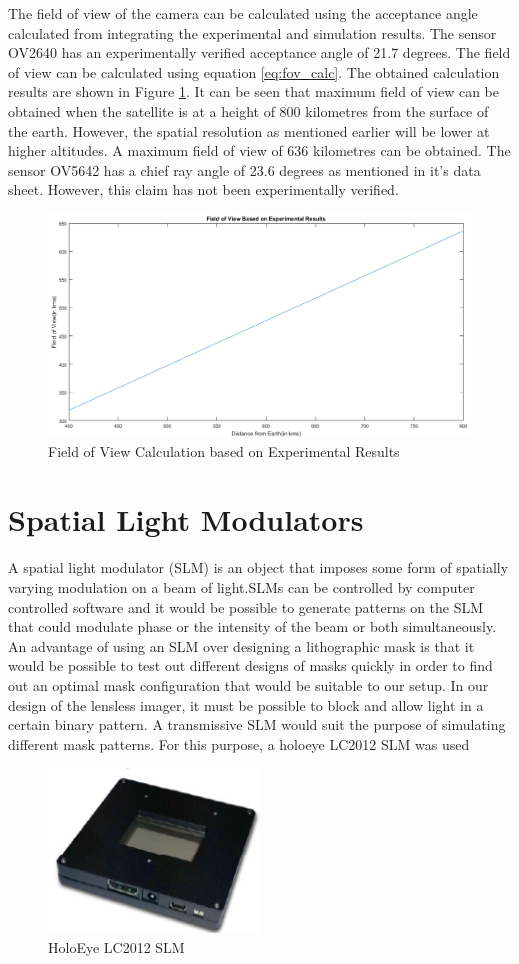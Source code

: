 The field of view of the camera can be calculated using the acceptance angle calculated from integrating the experimental and simulation results. The sensor OV2640 has an experimentally verified acceptance angle of 21.7 degrees. The field of view can be calculated using equation \ref{eq:fov_calc}. The obtained calculation results are shown in Figure \ref{fig:fov-graph-1}. It can be seen that maximum field of view can be obtained when the satellite is at a height of 800 kilometres from the surface of the earth. However, the spatial resolution as mentioned earlier will be lower at higher altitudes. A maximum field of view of 636 kilometres can be obtained. The sensor OV5642 has a chief ray angle of 23.6 degrees as mentioned in it's data sheet\cite{OV5642DS}. However, this claim has not been experimentally verified.

\begin{figure}[]
\centering
\includegraphics[width = \linewidth]{pics/fov-calc}
\caption{Field of View Calculation based on Experimental Results}
\label{fig:fov-graph-1}
\end{figure}

\section{Spatial Light Modulators}
A spatial light modulator (SLM) is an object that imposes some form of spatially varying modulation on a beam of light\cite{SLMWiki}.SLMs can be controlled by computer controlled software and it would be possible to generate patterns on the SLM that could modulate phase or the intensity of the beam or both simultaneously. An advantage of using an SLM over designing a lithographic mask is that it would be possible to test out different designs of masks quickly in order to find out an optimal mask configuration that would be suitable to our setup. In our design of the lensless imager, it must be possible to block and allow light in a certain binary pattern. A transmissive SLM would suit the purpose of simulating different mask patterns. For this purpose, a holoeye LC2012 SLM was used 

\begin{figure}[ht]
\centering
\includegraphics[width=0.5\textwidth]{pics/slm}
\caption{HoloEye LC2012 SLM}
\label{fig:slm}
\end{figure}

